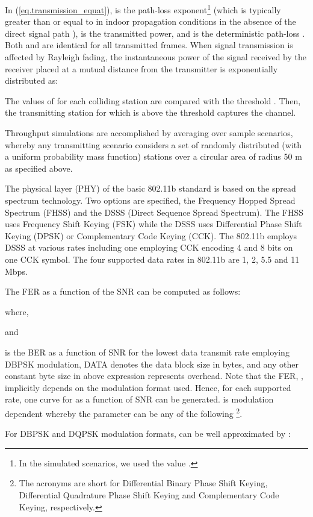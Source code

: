 \documentclass[10pt,onecolumn,a4paper]{IEEEtran}
\begin{document}
In (\ref{eq.transmission_equat}),  is the path-loss
exponent\footnote{In the simulated scenarios, we used the value
.} (which is typically greater than or equal to  in
indoor propagation conditions in the absence of the direct signal
path \cite{Rappaport}),  is the transmitted power, and
 is the deterministic path-loss
\cite{Rappaport}. Both  and  are identical for all
transmitted frames. When signal transmission is affected by
Rayleigh fading, the instantaneous power of the signal received by
the receiver placed at a mutual distance  from the
transmitter is exponentially distributed as:

The values of  for each colliding station are compared
with the threshold . Then, the transmitting
station for which  is above the threshold captures the
channel.

Throughput simulations are accomplished by averaging over 
sample scenarios, whereby any transmitting scenario considers a
set of  randomly distributed (with a uniform probability
mass function) stations over a circular area of radius 50 m as
specified above.

The physical layer (PHY) of the basic 802.11b standard is based on
the spread spectrum technology. Two options are specified, the
Frequency Hopped Spread Spectrum (FHSS) and the DSSS (Direct
Sequence Spread Spectrum). The FHSS uses Frequency Shift Keying
(FSK) while the DSSS uses Differential Phase Shift Keying (DPSK)
or Complementary Code Keying (CCK). The 802.11b employs DSSS at
various rates including one employing CCK encoding 4 and 8 bits on
one CCK symbol. The four supported data rates in 802.11b are 1, 2,
5.5 and 11 Mbps.


The FER as a function of the SNR can be computed as follows:

where,

and

 is the BER as a function of SNR for the lowest
data transmit rate employing DBPSK modulation, DATA denotes the
data block size in bytes, and any other constant byte size in
above expression represents overhead. Note that the FER,
, implicitly depends on the modulation format used.
Hence, for each supported rate, one curve for  as a
function of SNR can be generated.  is modulation
dependent whereby the parameter  can be any of the following
\footnote{The acronyms are
short for Differential Binary Phase Shift Keying, Differential
Quadrature Phase Shift Keying and Complementary Code Keying,
respectively.}.

For DBPSK and DQPSK modulation formats,  can be
well approximated by \cite{SimonAlouini}:
\end{document}
